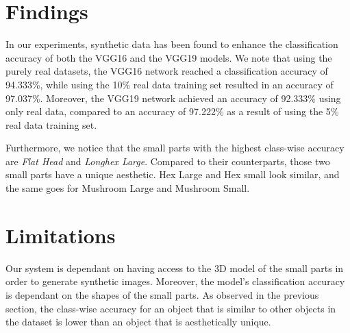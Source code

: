 \section{Findings}

In our experiments, synthetic data has been found to enhance the classification accuracy of both the VGG16 and the VGG19 models. We note that using the purely real datasets, the VGG16 network reached a classification accuracy of 94.333\%, while using the 10\% real data training set resulted in an accuracy of 97.037\%. Moreover, the VGG19 network achieved an accuracy of 92.333\% using only real data, compared to an accuracy of 97.222\% as a result of using the 5\% real data training set.

Furthermore, we notice that the small parts with the highest class-wise accuracy are \textit{Flat Head} and \textit{Longhex Large}. Compared to their counterparts, those two small parts have a unique aesthetic. Hex Large and Hex small look similar, and the same goes for Mushroom Large and Mushroom Small.

\section{Limitations}

Our system is dependant on having access to the 3D model of the small parts in order to generate synthetic images. Moreover, the model's classification accuracy is dependant on the shapes of the small parts. As observed in the previous section, the class-wise accuracy for an object that is similar to other objects in the dataset is lower than an object that is aesthetically unique.